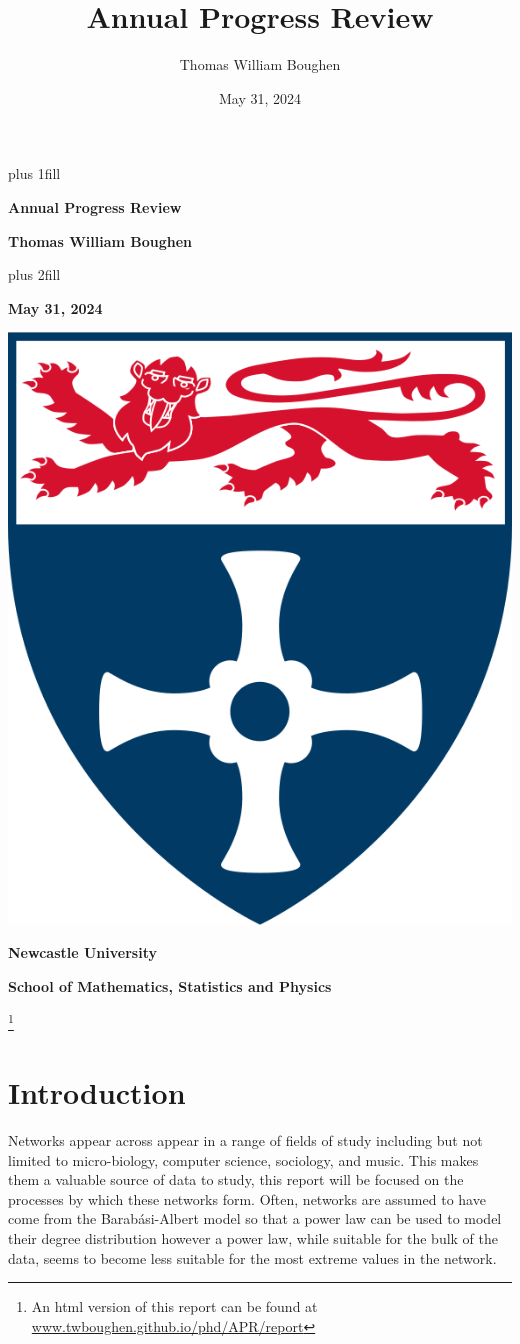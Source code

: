 \documentclass[
  10pt,
  a4paper,
]{scrreprt}
\title{Annual Progress Review}
\author{Thomas William Boughen}
\date{May 31, 2024}
\renewcommand*\contentsname{Table of contents}
\newcommand\contentsname{Table of contents}
\theoremstyle{plain}
\theoremstyle{definition}
\theoremstyle{plain}
\theoremstyle{remark}
\begin{document}
\cleardoublepage
\thispagestyle{empty}
{\centering
\hbox{}\vskip 0cm plus 1fill
{\Huge\bfseries Annual Progress Review \par}
\vspace{12ex}
{\Large\bfseries Thomas William Boughen \par}
\vspace{3ex}
\vskip 0cm plus 2fill
\vspace{3ex}
{\bfseries\large May 31, 2024 \par}
\vspace{12ex}
{\includegraphics[width=0.1\linewidth]{"imgs/University_of_Newcastle_Coat_of_Arms.png"}\par}
%
%
{\bfseries\large Newcastle University \par}
\vspace{3ex}
%
{\bfseries\large School of Mathematics, Statistics and Physics \par}
%
\vspace{12ex}
\footnote{An html version of this report can be found at \url{www.twboughen.github.io/phd/APR/report}}
\justifying
\noindent\ifdefined\Shaded\renewenvironment{Shaded}{\begin{tcolorbox}[sharp corners, interior hidden, enhanced, borderline west={3pt}{0pt}{shadecolor}, boxrule=0pt, breakable, frame hidden]}{\end{tcolorbox}}\fi

\renewcommand*\contentsname{Table of contents}
{
\hypersetup{linkcolor=}
\setcounter{tocdepth}{1}
\tableofcontents
}
\hypertarget{sec-int}{%
\chapter{Introduction}\label{sec-int}}

Networks appear across appear in a range of fields of study including
but not limited to micro-biology, computer science, sociology, and
music. This makes them a valuable source of data to study, this report
will be focused on the processes by which these networks form. Often,
networks are assumed to have come from the Barabási-Albert model so that
a power law can be used to model their degree distribution however a
power law, while suitable for the bulk of the data, seems to become less
suitable for the most extreme values in the network.

}
\end{document}
